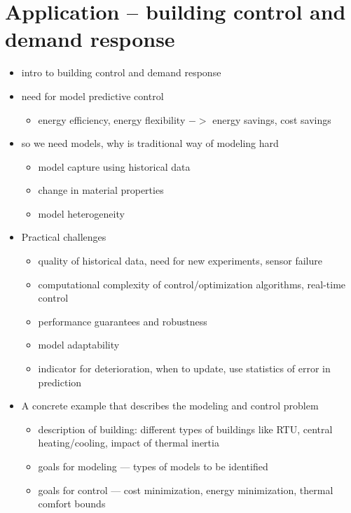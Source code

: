 \section{Application -- building control and demand response}

\begin{itemize}
	\item intro to building control and demand response
	\item need for model predictive control
	\begin{itemize}
		\item energy efficiency, energy flexibility \(->\) energy savings, cost savings
	\end{itemize}
	\item so we need models, why is traditional way of modeling hard  
	\begin{itemize}
		\item model capture using historical data  
		\item change in material properties  
		\item model heterogeneity
	\end{itemize}
	\item Practical challenges
	\begin{itemize}
		\item quality of historical data, need for new experiments, sensor failure  
		\item computational complexity of control/optimization algorithms, real-time control  
		\item performance guarantees and robustness  
		\item model adaptability
		\item indicator for deterioration, when to update, use statistics of error in prediction
	\end{itemize}
	\item A concrete example that describes the modeling and control problem
	\begin{itemize}
		\item description of building: different types of buildings like RTU, central heating/cooling, impact of thermal inertia 
		\item goals for modeling — types of models to be identified  
		\item goals for control — cost minimization, energy minimization, thermal comfort bounds 
	\end{itemize}
\end{itemize}